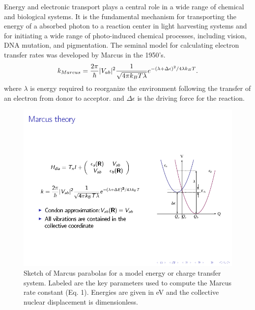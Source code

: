 Energy and electronic transport plays a central role in a
wide range of  chemical  and biological systems.
It is the fundamental mechanism for transporting the  energy  of a
absorbed photon to a reaction center in light harvesting systems
and for initiating a wide range of photo-induced  chemical processes,
including vision, DNA mutation, and pigmentation.
The seminal model for calculating electron transfer rates was developed by
Marcus in the 1950's\cite{marcus1956theory,marcus1965theory,marcus1993electron}.
\begin{equation}
k_{Marcus}=\frac{2\pi}{\hbar}|V_{ab}|^{2}\frac{1}{\sqrt{4\text{\ensuremath{\pi}}k_{B}T\lambda}}e^{-(\lambda+ \Delta\epsilon)^{2}/4\text{\ensuremath{\lambda}}k_{B}T}.\label{eq:marcus}
\end{equation}
where $\lambda$ is  energy required to reorganize the environment
following the transfer of an electron from donor to acceptor.
and $\Delta \epsilon$ is the driving force for the reaction.

\begin{figure}[b]
\includegraphics[width=0.5\columnwidth]{Chapters/chap2/Figure1}
\caption{Sketch of Marcus parabolas for a model energy or charge transfer system.
Labeled are the key parameters used to compute the Marcus rate constant (Eq. 1).
Energies are given in eV and the collective nuclear displacement  is dimensionless.
}
\label{marcus}
\end{figure}


